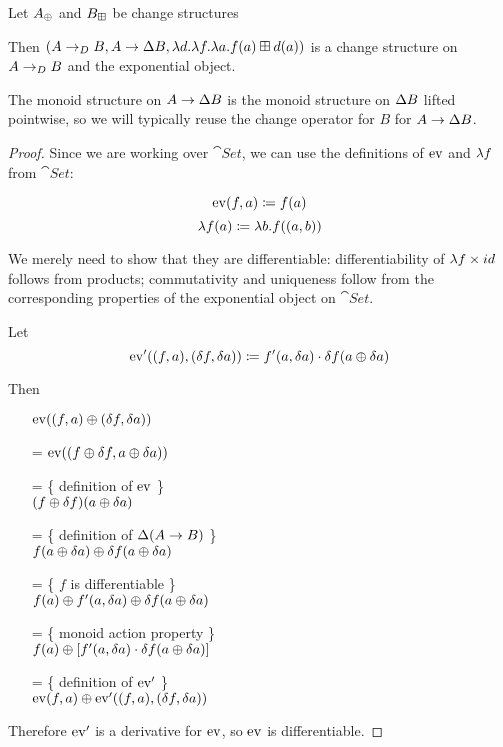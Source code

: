 \begin{prop}[Exponentials]
\label{prop:exponentials}
  Let $A_\oplus$ and $B_\boxplus$ be change structures

  Then $(A \rightarrow_{D} B,A
    \rightarrow \Delta B,\lambda d. \lambda f. \lambda a. f(a) \boxplus
    d(a))$ is a change structure on $A \rightarrow_{D} B$ and the exponential object.

  The monoid structure on $A \rightarrow \Delta B$ is the monoid
  structure on $\Delta B$ lifted pointwise, so we will typically reuse the
  change operator for $B$ for $A \rightarrow \Delta B$.
\end{prop}
\begin{proof}
  Since we are working over $\cat{Set}$, we can use the definitions of $\operatorname{ev}$ and
  $\lambda f$ from $\cat{Set}$:

  $$\operatorname{ev}(f, a) \coloneqq f(a)$$
  $$\lambda f(a) \coloneqq \lambda b. f((a, b))$$
  
  We merely need to show that they are differentiable: differentiability of $\lambda f
  \times id$ follows from products; commutativity and
  uniqueness follow from the corresponding properties of the exponential object
  on $\cat{Set}$.

  Let 
  $$\operatorname{ev}'((f, a), (\delta f, \delta a)) \coloneqq f'(a, \delta a) \cdot \delta f(a \oplus \delta a)$$

  Then
  \begin{itemize}
    \item[ ]$\operatorname{ev}((f, a) \oplus (\delta f, \delta a))$
    \item[=]$\operatorname{ev}((f \oplus \delta f, a \oplus \delta a))$
    \item[=]\{ definition of $\operatorname{ev}$ \}\\
      $(f \oplus \delta f)(a \oplus \delta a)$
    \item[=]\{ definition of $\Delta (A \rightarrow B)$ \}\\
      $f(a \oplus \delta a) \oplus \delta f(a \oplus \delta a)$
    \item[=]\{ $f$ is differentiable \}\\
      $f(a) \oplus f'(a, \delta a) \oplus \delta f(a \oplus \delta a)$
    \item[=]\{ monoid action property \}\\
      $f(a) \oplus \left[ f'(a, \delta a) \cdot \delta f(a \oplus \delta a)\right]$
    \item[=]\{ definition of $\operatorname{ev}'$ \}\\
      $\operatorname{ev}(f, a) \oplus \operatorname{ev}'((f, a), (\delta f, \delta a))$
  \end{itemize}
  Therefore $\operatorname{ev}'$ is a derivative for $\operatorname{ev}$, so $\operatorname{ev}$ is differentiable.
  

\end{proof}
